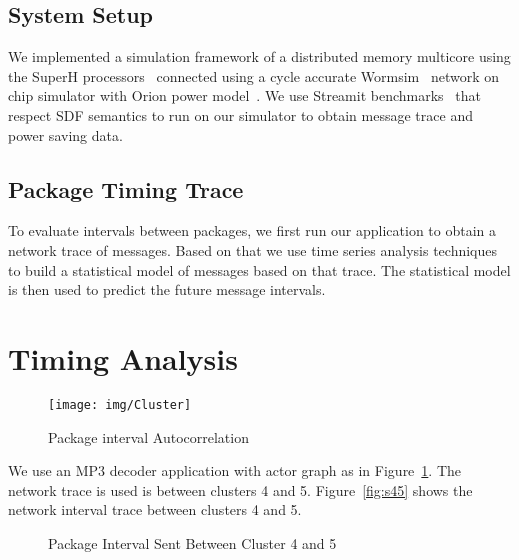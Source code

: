 \documentclass[12pt]{article}
\begin{document}
\subsection{System Setup}
We implemented a simulation framework of a distributed memory multicore using
the SuperH processors~\cite{Stanley-MarbellSunflower} connected using a
cycle accurate Wormsim~\cite{Wormsim} network on chip simulator with Orion power
model~\cite{WangOrion}. We use Streamit benchmarks~\cite{ThiesStreamIt} that
respect SDF semantics to run on our simulator to obtain message trace and power
saving data.

\subsection{Package Timing Trace}
To evaluate intervals between packages, we first run our application to obtain a
network trace of messages. Based on that we use time series analysis
techniques~\cite{BrillingerTimeSeries, ShumwayTimeSeries} to build a statistical
model of messages based on that trace. The statistical model is then used to
predict the future message intervals. 
\section{Timing Analysis}
\begin{figure}[ht!]
\centering
\texttt{[image: img/Cluster]}
\caption{Package interval Autocorrelation}\label{fig:Cluster}
\end{figure}
We use an MP3 decoder application with actor graph as in
Figure~\ref{fig:Cluster}. The network trace is used is between clusters 4 and 5.
Figure~\ref{fig:s45} shows the network interval trace between clusters 4 and 5.

\begin{figure*}[ht!]
\centering
{}
\caption{Package Interval Sent Between Cluster 4 and 5}
\end{figure*}

\end{document}
